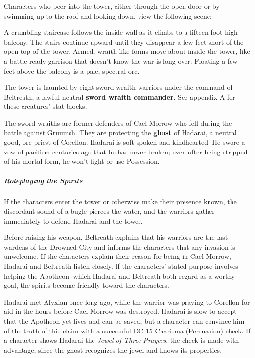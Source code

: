 \documentclass[10pt,a4paper,twoside,fancy,bg=print,twocolumn,openany,nodeprecatedcode]{dndbook}
\begin{document}
Characters who peer into the tower, either through the open door or by swimming up to the roof and looking down, view the following scene:

\begin{DndReadAloud}{}
A crumbling staircase follows the inside wall as it climbs to a fifteen-foot-high balcony. The stairs continue upward until they disappear a few feet short of the open top of the tower. Armed, wraith-like forms move about inside the tower, like a battle-ready garrison that doesn't know the war is long over. Floating a few feet above the balcony is a pale, spectral orc.

\end{DndReadAloud}

The tower is haunted by eight sword wraith warriors under the command of Beltreath, a lawful neutral \textbf{sword wraith commander}. See appendix A for these creatures' stat blocks.

The sword wraiths are former defenders of Cael Morrow who fell during the battle against Gruumsh. They are protecting the \textbf{ghost} of Hadarai, a neutral good, orc priest of Corellon. Hadarai is soft-spoken and kindhearted. He swore a vow of pacifism centuries ago that he has never broken; even after being stripped of his mortal form, he won't fight or use Possession.

\subparagraph{Roleplaying the Spirits}
If the characters enter the tower or otherwise make their presence known, the discordant sound of a bugle pierces the water, and the warriors gather immediately to defend Hadarai and the tower.

Before raising his weapon, Beltreath explains that his warriors are the last wardens of the Drowned City and informs the characters that any invasion is unwelcome. If the characters explain their reason for being in Cael Morrow, Hadarai and Beltreath listen closely. If the characters' stated purpose involves helping the Apotheon, which Hadarai and Beltreath both regard as a worthy goal, the spirits become friendly toward the characters.

Hadarai met Alyxian once long ago, while the warrior was praying to Corellon for aid in the hours before Cael Morrow was destroyed. Hadarai is slow to accept that the Apotheon yet lives and can be saved, but a character can convince him of the truth of this claim with a successful DC 15 Charisma (Persuasion) check. If a character shows Hadarai the \textit{Jewel of Three Prayers}, the check is made with advantage, since the ghost recognizes the jewel and knows its properties.
\end{document}
